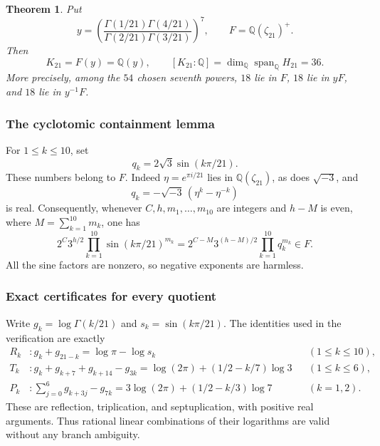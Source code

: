 \documentclass[11pt,a4paper]{article}
\newtheorem{theorem}{Theorem}[section]
\theoremstyle{definition}
\theoremstyle{remark}
\numberwithin{equation}{section}
\begin{document}
\begin{theorem}
Put
\[
 y=\left(\frac{\Gamma(1/21)\Gamma(4/21)}
 {\Gamma(2/21)\Gamma(3/21)}\right)^7,
 \qquad F=\mathbb Q(\zeta_{21})^+.
\]
Then
\[
 \boxed{K_{21}=F(y)=\mathbb Q(y),\qquad
 [K_{21}:\mathbb Q]=\dim_{\mathbb Q}\operatorname{span}_{\mathbb Q}H_{21}=36.}
\]
More precisely, among the $54$ chosen seventh powers, $18$ lie in $F$,
$18$ lie in $yF$, and $18$ lie in $y^{-1}F$.
\end{theorem}

\subsubsection{The cyclotomic containment lemma}
For $1\leq k\leq10$, set
\[
 q_k=2\sqrt3\sin(k\pi/21).
\]
These numbers belong to $F$. Indeed $\eta=e^{\pi i/21}$ lies in
$\mathbb Q(\zeta_{21})$, as does $\sqrt{-3}$, and
\[
 q_k=-\sqrt{-3}\,(\eta^k-\eta^{-k})
\]
is real. Consequently, whenever $C,h,m_1,\ldots,m_{10}$ are integers
and $h-M$ is even, where $M=\sum_{k=1}^{10}m_k$, one has
\begin{equation}\label{fields-eq:n21-cyclotomic-containment}
 2^C3^{h/2}\prod_{k=1}^{10}\sin(k\pi/21)^{m_k}
 =2^{C-M}3^{(h-M)/2}\prod_{k=1}^{10}q_k^{m_k}\in F.
\end{equation}
All the sine factors are nonzero, so negative exponents are harmless.

\subsubsection{Exact certificates for every quotient}
Write $g_k=\log\Gamma(k/21)$ and $s_k=\sin(k\pi/21)$. The identities
used in the verification are exactly
\begin{align*}
 R_k&:g_k+g_{21-k}=\log\pi-\log s_k
       &&(1\leq k\leq10),\\
 T_k&:g_k+g_{k+7}+g_{k+14}-g_{3k}
       =\log(2\pi)+(1/2-k/7)\log3
       &&(1\leq k\leq6),\\
 P_k&:\sum_{j=0}^{6}g_{k+3j}-g_{7k}
       =3\log(2\pi)+(1/2-k/3)\log7
       &&(k=1,2).
\end{align*}
These are reflection, triplication, and septuplication, with positive
real arguments. Thus rational linear combinations of their logarithms
are valid without any branch ambiguity.
\end{document}
